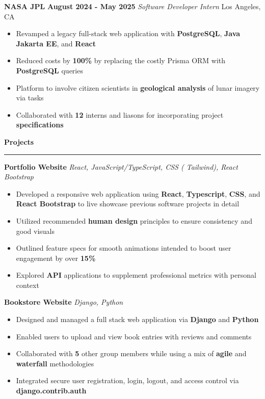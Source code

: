 \documentclass[11pt]{article}
\begin{document}
\textbf{NASA JPL}
\hfill
\textbf{August 2024 - May 2025}
\newline
\textit{Software Developer Intern}%
\hfill
Los Angeles, CA
\begin{itemize}[itemsep=0pt, topsep=0pt]
    \item Revamped a legacy full-stack web application with 
    \textbf{
        PostgreSQL}, 
    \textbf{
        Java Jakarta EE}, 
    and \textbf{
        React}
    \item Reduced costs by \textbf{100\%} by replacing the costly Prisma ORM with \textbf{PostgreSQL} queries
    \item Platform to involve citizen scientists in \textbf{geological analysis} of lunar imagery via tasks
    \item Collaborated with \textbf{12} interns and liasons for incorporating project \textbf{specifications}
\end{itemize}

\textbf{Projects}
\vspace{-10pt}
\newline
\rule{\textwidth}{0.4pt}

\textbf{Portfolio Website {\textbar}}
\textit{
    {
    React,
    JavaScript/TypeScript,
    CSS 
    (
    Tailwind),
    React Bootstrap
    }
}

\begin{itemize}[itemsep=0pt, topsep=0pt]
    \item Developed a responsive web application using \textbf{React}, \textbf{Typescript}, \textbf{CSS}, and \textbf{React Bootstrap} to live showcase previous software projects in detail
    \item Utilized recommended \textbf{human design} principles to ensure consistency and good visuals
    \item Outlined feature specs for smooth animations intended to boost user engagement by over \textbf{15\%}
    \item Explored \textbf{API} applications to supplement professional metrics with personal context
\end{itemize}

\textbf{Bookstore Website {\textbar}}
\textit{
    {
    Django, 
    Python}
}
\begin{itemize}[itemsep=0pt, topsep=0pt]
    \item Designed and managed a full stack web application via \textbf{Django} and \textbf{Python}
    \item Enabled users to upload and view book entries with reviews and comments
    \item Collaborated with \textbf{5} other group members while using a mix of \textbf{agile} and \textbf{waterfall} methodologies 
    \item Integrated secure user registration, login, logout, and access control via \textbf{django.contrib.auth}
\end{itemize}
\end{document}
